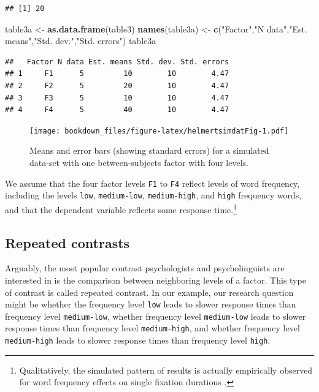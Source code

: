 \documentclass[12pt,]{krantz}
\newenvironment{Shaded}{\begin{snugshade}}{\end{snugshade}}
\newcommand{\KeywordTok}[1]{\textcolor[rgb]{0.13,0.29,0.53}{\textbf{#1}}}
\newcommand{\NormalTok}[1]{#1}
\newcommand{\StringTok}[1]{\textcolor[rgb]{0.31,0.60,0.02}{#1}}
\theoremstyle{definition}
\theoremstyle{definition}
\theoremstyle{definition}
\theoremstyle{remark}
\begin{document}
\begin{verbatim}
## [1] 20
\end{verbatim}

\begin{Shaded}
\begin{Highlighting}[]
\NormalTok{table3a <-}\StringTok{ }\KeywordTok{as.data.frame}\NormalTok{(table3)}
\KeywordTok{names}\NormalTok{(table3a) <-}\StringTok{ }\KeywordTok{c}\NormalTok{(}\StringTok{"Factor"}\NormalTok{,}\StringTok{"N data"}\NormalTok{,}\StringTok{"Est. means"}\NormalTok{,}\StringTok{"Std. dev."}\NormalTok{,}\StringTok{"Std. errors"}\NormalTok{)}
\NormalTok{table3a}
\end{Highlighting}
\end{Shaded}

\begin{verbatim}
##   Factor N data Est. means Std. dev. Std. errors
## 1     F1      5         10        10        4.47
## 2     F2      5         20        10        4.47
## 3     F3      5         10        10        4.47
## 4     F4      5         40        10        4.47
\end{verbatim}

\begin{figure}
\centering
\texttt{[image: bookdown\_files/figure-latex/helmertsimdatFig-1.pdf]}
\caption{\label{fig:helmertsimdatFig}Means and error bars (showing standard errors) for a simulated data-set with one between-subjects factor with four levels.}
\end{figure}

We assume that the four factor levels \texttt{F1} to \texttt{F4} reflect levels of word frequency, including the levels \texttt{low}, \texttt{medium-low}, \texttt{medium-high}, and \texttt{high} frequency words, and that the dependent variable reflects some response time.\footnote{Qualitatively, the simulated pattern of results is actually empirically observed for word frequency effects on single fixation durations \citep{heister2012analysing}.}

\hypertarget{repeatedcontrasts}{%
\subsection{Repeated contrasts}\label{repeatedcontrasts}}

Arguably, the most popular contrast psychologists and psycholinguists are interested in is the comparison between neighboring levels of a factor. This type of contrast is called repeated contrast. In our example, our research question might be whether the frequency level \texttt{low} leads to slower response times than frequency level \texttt{medium-low}, whether frequency level \texttt{medium-low} leads to slower response times than frequency level \texttt{medium-high}, and whether frequency level \texttt{medium-high} leads to slower response times than frequency level \texttt{high}.
\end{document}
